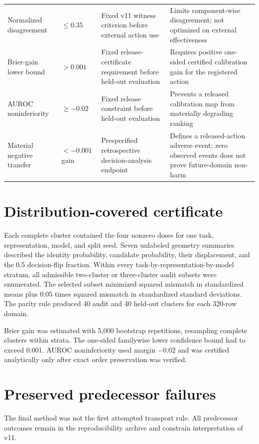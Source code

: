 \documentclass[preprint,12pt]{elsarticle}
\begin{document}
\begin{longtable}{>{\raggedright\arraybackslash}p{}>{\raggedright\arraybackslash}p{}>{\raggedright\arraybackslash}p{}>{\raggedright\arraybackslash}p{}}
Normalized disagreement & $\leq0.35$ & Fixed v11 witness criterion before external action use & Limits component-wise disagreement; not optimized on external effectiveness \\
Brier-gain lower bound & $>0.001$ & Fixed release-certificate requirement before held-out evaluation & Requires positive one-sided certified calibration gain for the registered action \\
AUROC noninferiority & $\geq-0.02$ & Fixed release constraint before held-out evaluation & Prevents a released calibration map from materially degrading ranking \\
Material negative transfer & $<-0.001$ gain & Prespecified retrospective decision-analysis endpoint & Defines a released-action adverse event; zero observed events does not prove future-domain non-harm \\
\end{longtable}
\endgroup

\section{Distribution-covered certificate}

Each complete cluster contained the four nonzero doses for one task, representation, model, and split seed. Seven unlabeled geometry summaries described the identity probability, candidate probability, their displacement, and the 0.5 decision-flip fraction. Within every task-by-representation-by-model stratum, all admissible two-cluster or three-cluster audit subsets were enumerated. The selected subset minimized squared mismatch in standardized means plus 0.05 times squared mismatch in standardized standard deviations. The parity rule produced 40 audit and 40 held-out clusters for each 320-row domain.

Brier gain was estimated with 5,000 bootstrap repetitions, resampling complete clusters within strata. The one-sided familywise lower confidence bound had to exceed 0.001. AUROC noninferiority used margin $-0.02$ and was certified analytically only after exact order preservation was verified.

\section{Preserved predecessor failures}

The final method was not the first attempted transport rule. All predecessor outcomes remain in the reproducibility archive and constrain interpretation of v11.
\end{document}
